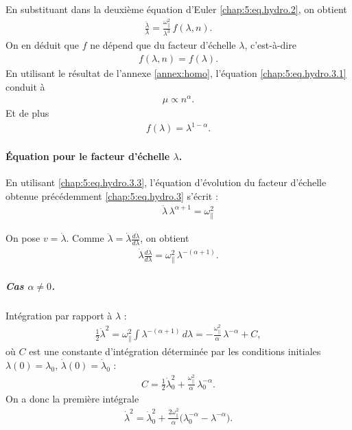 En substituant dans la deuxième équation d'Euler \eqref{chap:5:eq.hydro.2}, on obtient
\begin{eqnarray}\label{chap:5:eq.hydro.3}
	\frac{\ddot\lambda}{\lambda}  
	 =  \frac{\omega_\parallel^2}{\lambda^3} \, f(\lambda,n)  .
\end{eqnarray}
On en déduit que $f$ ne dépend que du facteur d'échelle $\lambda$, c’est-à-dire
\begin{eqnarray}\label{chap:5:eq.hydro.3.1}
	f(\lambda , n ) = f(\lambda).	
\end{eqnarray}
En utilisant le résultat de l'annexe \ref{annex:homo}, l’équation \eqref{chap:5:eq.hydro.3.1} conduit à
\begin{eqnarray}\label{chap:5:eq.hydro.3.2}
	\mu \propto n^\alpha.
\end{eqnarray}
Et de plus 
\begin{eqnarray}\label{chap:5:eq.hydro.3.3}
	f(\lambda) = \lambda^{1-\alpha}.
\end{eqnarray}


\medskip

\paragraph{Équation pour le facteur d'échelle $\lambda$.}

En utilisant \eqref{chap:5:eq.hydro.3.3}, l'équation d'évolution du facteur d'échelle obtenue précédemment \eqref{chap:5:eq.hydro.3} s'écrit :
\begin{eqnarray}\label{chap:5:eq.hydro.3.4}
	\qquad \ddot\lambda\,\lambda^{\alpha+1}=\omega_\parallel^2	
\end{eqnarray}


On pose \(v=\dot\lambda\). Comme \(\ddot\lambda=\dot\lambda\frac{d\dot\lambda}{d\lambda}\), on obtient
\begin{eqnarray}
	\dot\lambda\frac{d\dot\lambda}{d\lambda}=\omega_\parallel^2\,\lambda^{-(\alpha+1)}.
\end{eqnarray}

\subparagraph{Cas \(\alpha\neq0\).}
Intégration par rapport à \(\lambda\) :
\begin{eqnarray}
\frac{1}{2}\dot\lambda^2
= \omega_\parallel^2\int \lambda^{-(\alpha+1)}\,d\lambda
= -\frac{\omega_\parallel^2}{\alpha}\,\lambda^{-\alpha} + C,
\end{eqnarray}
où \(C\) est une constante d'intégration déterminée par les conditions initiales \(\lambda(0)=\lambda_0\), \(\dot\lambda(0)=\dot\lambda_0\) :
\begin{eqnarray}
C=\frac{1}{2}\dot\lambda_0^2+\frac{\omega_\parallel^2}{\alpha}\,\lambda_0^{-\alpha}.
\end{eqnarray}
On a donc la première intégrale
\begin{eqnarray}
\dot\lambda^2
= \dot\lambda_0^2 + \frac{2\omega_\parallel^2}{\alpha}\big(\lambda_0^{-\alpha}-\lambda^{-\alpha}\big).
\end{eqnarray}

